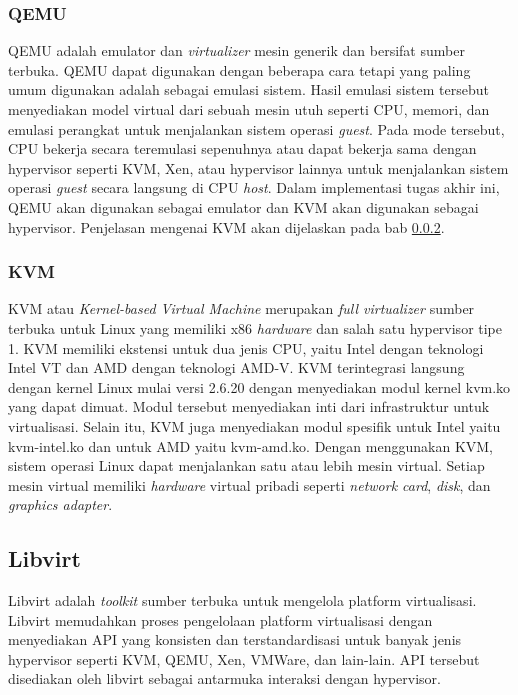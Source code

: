 \subsubsection{QEMU}

QEMU \parencite{qemu-website} adalah emulator dan \emph{virtualizer} mesin generik dan bersifat sumber terbuka.
QEMU dapat digunakan dengan beberapa cara tetapi yang paling umum digunakan adalah sebagai
emulasi sistem. Hasil emulasi sistem tersebut menyediakan model virtual dari sebuah mesin
utuh seperti CPU, memori, dan emulasi perangkat untuk menjalankan sistem operasi \emph{guest}.
Pada mode tersebut, CPU bekerja secara teremulasi sepenuhnya atau dapat bekerja sama
dengan hypervisor seperti KVM, Xen, atau hypervisor lainnya untuk menjalankan sistem
operasi \emph{guest} secara langsung di CPU \emph{host}.
Dalam implementasi tugas akhir ini, QEMU akan digunakan sebagai emulator dan KVM
akan digunakan sebagai hypervisor. Penjelasan mengenai KVM akan dijelaskan pada bab \ref{sec:kvm}.

\subsubsection{KVM}
\label{sec:kvm}

KVM atau \emph{Kernel-based Virtual Machine} \parencite{kvm-website} merupakan \emph{full virtualizer} sumber terbuka
untuk Linux yang memiliki x86 \emph{hardware} dan salah satu hypervisor tipe 1. KVM memiliki ekstensi untuk dua jenis
CPU, yaitu Intel dengan teknologi Intel VT dan AMD dengan teknologi AMD-V. KVM terintegrasi
langsung dengan kernel Linux mulai versi 2.6.20 dengan menyediakan modul kernel kvm.ko yang dapat dimuat.
Modul tersebut menyediakan inti dari infrastruktur untuk virtualisasi. Selain itu, KVM
juga menyediakan modul spesifik untuk Intel yaitu kvm-intel.ko dan untuk AMD yaitu
kvm-amd.ko. Dengan menggunakan KVM, sistem operasi Linux dapat menjalankan satu atau lebih
mesin virtual. Setiap mesin virtual memiliki \emph{hardware} virtual pribadi seperti
\emph{network card}, \emph{disk}, dan \emph{graphics adapter}.

\subsection{Libvirt}
\label{sec:libvirt}

Libvirt adalah \emph{toolkit} sumber terbuka untuk mengelola platform virtualisasi.
Libvirt memudahkan proses pengelolaan platform virtualisasi dengan menyediakan API yang konsisten
dan terstandardisasi untuk banyak jenis hypervisor seperti KVM, QEMU, Xen, VMWare,
dan lain-lain. API tersebut disediakan oleh libvirt sebagai antarmuka interaksi dengan hypervisor.

